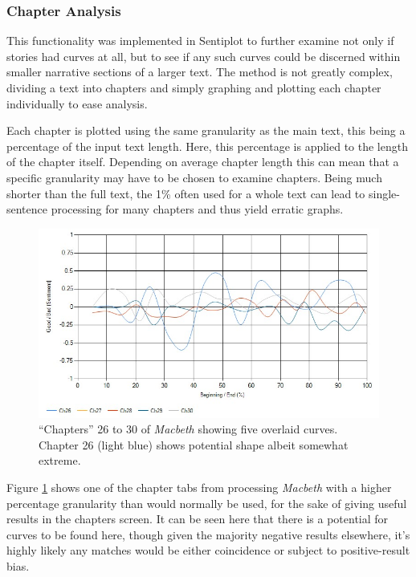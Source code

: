 \documentclass{article}
\begin{document}
{        \subsubsection{Chapter Analysis}
            This functionality was implemented in Sentiplot to further examine not only if stories had curves at all, but to see if any such curves could be discerned within smaller narrative sections of a larger text. The method is not greatly complex, dividing a text into chapters and simply graphing and plotting each chapter individually to ease analysis.

            Each chapter is plotted using the same granularity as the main text, this being a percentage of the input text length. Here, this percentage is applied to the length of the chapter itself. Depending on average chapter length this can mean that a specific granularity may have to be chosen to examine chapters. Being much shorter than the full text, the 1\% often used for a whole text can lead to single-sentence processing for many chapters and thus yield erratic graphs.
            \begin{figure}
                \includegraphics[width=1\textwidth]{Figures/Chap/Macbeth}
                \centering
                \caption{``Chapters'' 26 to 30 of \textit{Macbeth} showing five overlaid curves. Chapter 26 (light blue) shows potential shape albeit somewhat extreme.} 
                \label{fig:macbethChap}
            \end{figure}
            Figure \ref{fig:macbethChap} shows one of the chapter tabs from processing \textit{Macbeth} with a higher percentage granularity than would normally be used, for the sake of giving useful results in the chapters screen. It can be seen here that there is a potential for curves to be found here, though given the majority negative results elsewhere, it's highly likely any matches would be either coincidence or subject to positive-result bias.
}
\end{document}
